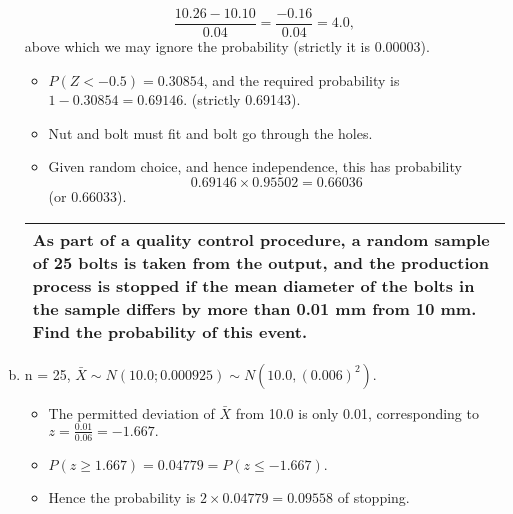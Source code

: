 \documentclass[a4paper,12pt]{article}
\begin{document}
\begin{enumerate}[(a)]
\[ \frac{10.26-10.10}{0.04} = \frac{ -0.16}{0.04} = 4.0,\]
above which we
may ignore the probability (strictly it is 0.00003). 
\begin{itemize}
\item $P(Z < -0.5) = 0.30854$,
and the required probability is $1 - 0.30854 = 0.69146.$ (strictly 0.69143).
\item Nut and bolt must fit and bolt go through the holes.
\item Given random choice,
and hence independence, this has probability \[0.69146 \times 0.95502 = 0.66036\]
(or 0.66033).
\end{itemize}
\newpage
  \begin{table}[ht!]
     \centering
     \begin{tabular}{|p{15cm}|}
     \hline  
 As part of a quality control procedure, a random sample of 25 bolts is taken from the output, and the production process is stopped if the mean diameter of the bolts in the sample differs by more than 0.01 mm from 10 mm.  Find the probability of this event.
\\ \hline
      \end{tabular}
    \end{table}


\item n = 25, $\bar{X} \sim N(10.0; 0.0009
25 ) \sim N(10.0, (0.006)^2)$.
\begin{itemize}
\item The permitted deviation of $\bar{X}$ from 10.0 is only 0.01, corresponding to $z = \frac{0.01}{0.06} = -1.667.$

\item $P(z \geq 1.667) = 0.04779 = P(z \leq -1.667)$.
\item Hence the probability is $2 \times 0.04779 = 0.09558$ of stopping.
\end{itemize}
\end{enumerate}
\end{document}
